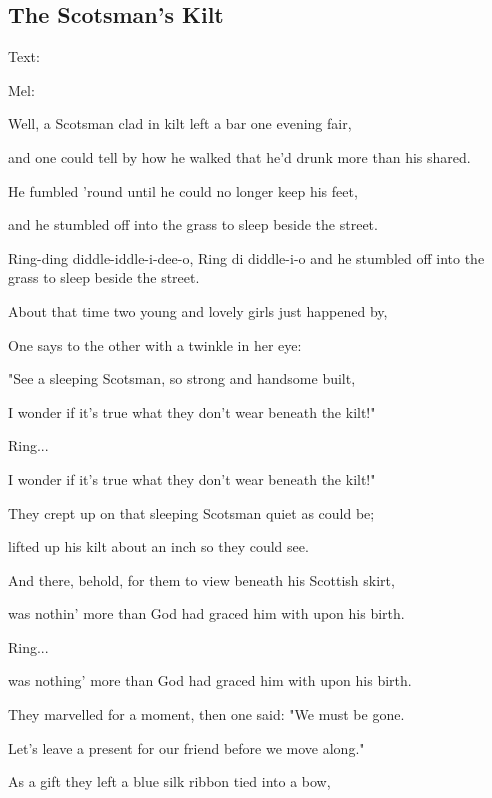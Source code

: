 

\pagestyle{Längre sånger}



\subsection{\textbf{The Scotsman's Kilt}}

Text: 

Mel: \bigskip

Well, a Scotsman clad in kilt left a bar one evening fair,

and one could tell by how he walked that he'd drunk more than his shared.

He fumbled 'round until he could no longer keep his feet,

and he stumbled off into the grass to sleep beside the street.\bigskip

Ring-ding diddle-iddle-i-dee-o, Ring di diddle-i-o
and he stumbled off into the grass to sleep beside the street.\bigskip

About that time two young and lovely girls just happened by,

One says to the other with a twinkle in her eye:

"See a sleeping Scotsman, so strong and handsome built,

I wonder if it's true what they don't wear beneath the kilt!"\bigskip

Ring...

I wonder if it's true what they don't wear beneath the kilt!"\bigskip

They crept up on that sleeping Scotsman quiet as could be;

lifted up his kilt about an inch so they could see.

And there, behold, for them to view beneath his Scottish skirt,

was nothin' more than God had graced him with upon his birth. 

Ring...

was nothing' more than God had graced him with upon his birth.\bigskip

They marvelled for a moment, then one said: "We must be gone.

Let's leave a present for our friend before we move along."

As a gift they left a blue silk ribbon tied into a bow,

